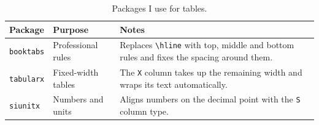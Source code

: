 \documentclass{article}
\begin{document}
\begin{table}[htbp]
  \centering
  \caption{Packages I use for tables.}
  \label{tab:packages}
  \begin{tabularx}{\textwidth}{@{}l l >{\raggedright\arraybackslash}X@{}}
    \toprule
    Package           & Purpose             & Notes \\
    \midrule
    \texttt{booktabs} & Professional rules  & Replaces \texttt{\textbackslash hline} with top, middle and bottom rules and fixes the spacing around them. \\
    \texttt{tabularx} & Fixed-width tables  & The \texttt{X} column takes up the remaining width and wraps its text automatically. \\
    \texttt{siunitx}  & Numbers and units   & Aligns numbers on the decimal point with the \texttt{S} column type. \\
    \bottomrule
  \end{tabularx}
\end{table}
\end{document}
